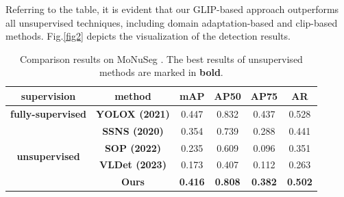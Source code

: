 \documentclass[runningheads]{llncs}
\begin{document}
Referring to the table, it is evident that our GLIP-based approach outperforms all unsupervised techniques, including domain adaptation-based and clip-based methods. Fig.\ref{fig2} depicts the visualization of the detection results.
\begin{table}[t]
\caption{Comparison results on MoNuSeg \cite{kumar2017dataset}. The best results of unsupervised methods are marked in \textbf{bold}.}
\begin{center}
\begin{tabular}{c|c|cccc}
\hline
\textbf{supervision} & \textbf{method} & \textbf{mAP} & \textbf{AP50} & \textbf{AP75} & \textbf{AR} \\ \hline
\textbf{fully-supervised} & \textbf{YOLOX (2021)} & 0.447 & 0.832 & 0.437 & 0.528 \\ \hline
\multirow{4}{*}{\textbf{unsupervised}} & \textbf{SSNS (2020)} & 0.354 & 0.739 & 0.288 & 0.441 \\
 & \textbf{SOP (2022)} & 0.235 & 0.609 & 0.096 & 0.351 \\
 & \textbf{VLDet (2023) } & 0.173 & 0.407 & 0.112 & 0.263 \\
 & \textbf{Ours} & \textbf{0.416} & \textbf{0.808} & \textbf{0.382} & \textbf{0.502} \\ \hline
\end{tabular}
\label{tab：comparison}
\end{center}
\end{table}


\end{document}
